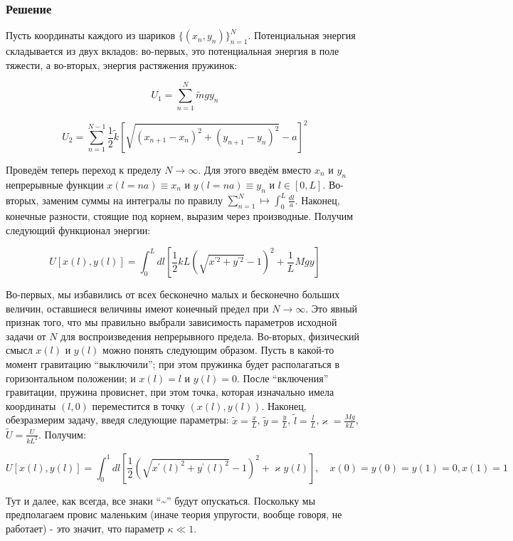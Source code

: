 \documentclass[a4paper,12pt]{article}
\begin{document}
\subsubsection*{Решение}

Пусть координаты каждого из шариков $\{(x_{n},y_{n})\}_{n=1}^{N}$.
Потенциальная энергия складывается из двух вкладов: во-первых, это
потенциальная энергия в поле тяжести, а во-вторых, энергия растяжения
пружинок:

\[
U_{1}=\sum_{n=1}^{N}\tilde{m}gy_{n}
\]


\[
U_{2}=\sum_{n=1}^{N-1}\frac{1}{2}\tilde{k}\left[\sqrt{\left(x_{n+1}-x_{n}\right)^{2}+\left(y_{n+1}-y_{n}\right)^{2}}-a\right]^{2}
\]

\noindent
Проведём теперь переход к пределу $N\to\infty$. Для этого введём
вместо $x_{n}$ и $y_{n}$ непрерывные функции $x(l=na)\equiv x_{n}$
и $y(l=na)\equiv y_{n}$ и $l\in[0,L]$. Во-вторых, заменим суммы
на интегралы по правилу $\sum_{n=1}^{N}\mapsto\int_{0}^{L}\frac{dl}{a}$.
Наконец, конечные разности, стоящие под корнем, выразим через производные.
Получим следующий функционал энергии:

\[
U[x(l),y(l)]=\int_{0}^{L}dl\left[\frac{1}{2}kL\left(\sqrt{x^{\prime2}+y^{\prime2}}-1\right)^{2}+\frac{1}{L}Mgy\right]
\]

\noindent
Во-первых, мы избавились от всех бесконечно малых и бесконечно больших
величин, оставшиеся величины имеют конечный предел при $N\to\infty$.
Это явный признак того, что мы правильно выбрали зависимость параметров
исходной задачи от $N$ для воспроизведения непрерывного предела.
Во-вторых, физический смысл $x(l)$ и $y(l)$ можно понять следующим
образом. Пусть в какой-то момент гравитацию ``выключили''; при этом
пружинка будет располагаться в горизонтальном положении; и $x(l)=l$
и $y(l)=0$. После ``включения'' гравитации, пружина провиснет,
при этом точка, которая изначально имела координаты $(l,0)$ переместится
в точку $(x(l),y(l))$. Наконец, обезразмерим задачу, введя следующие
параметры: $\tilde{x}=\frac{x}{L}$, $\tilde{y}=\frac{y}{L}$, $\tilde{l}=\frac{l}{L}$,$\varkappa=\frac{Mg}{kL}$,
$\tilde{U}=\frac{U}{kL^{2}}$. Получим:

\[
U\left[x(l),y(l)\right]=\int_{0}^{1}dl\left[\frac{1}{2}\left(\sqrt{x^{\prime}(l)^{2}+y^{\prime}(l)^{2}}-1\right)^{2}+\varkappa y(l)\right],
\quad x(0)=y(0)=y(1)=0,x(1)=1
\]

\noindent
Тут и далее, как всегда, все знаки ``\textasciitilde{}'' будут опускаться.
Поскольку мы предполагаем провис маленьким (иначе теория упругости,
вообще говоря, не работает) - это значит, что параметр $\kappa\ll1$.
\end{document}
